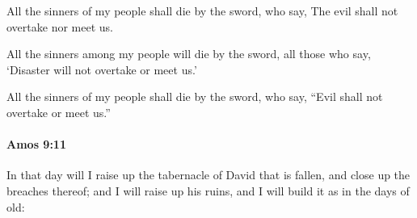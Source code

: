 			\begin{versebox}
					\item[BHS] 
					\item[LXX] 
					\item[ASV] All the sinners of my people shall die by the sword, who say, The evil shall not overtake nor meet us.
					\item[NIV] All the sinners among my people will die by the sword, all those who say, ‘Disaster will not overtake or meet us.’
					\item[NRSV] All the sinners of my people shall die by the sword, who say, “Evil shall not overtake or meet us.”
			\end{versebox}

		\paragraph{Amos 9:11} %
			\label{AMOS-9-11}

			In that day will I raise up the tabernacle of David that is fallen, and close up the breaches thereof; and I will raise up his ruins, and I will build it as in the days of old:

